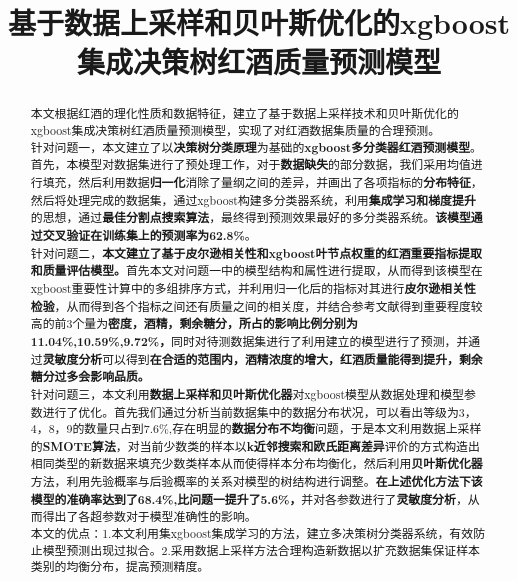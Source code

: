\documentclass{whutmod}
\title{基于数据上采样和贝叶斯优化的xgboost集成决策树红酒质量预测模型}
\begin{document}
\maketitle
\begin{abstract}
	本文根据红酒的理化性质和数据特征，建立了基于数据上采样技术和贝叶斯优化的xgboost集成决策树红酒质量预测模型，实现了对红酒数据集质量的合理预测。
	~\\
	
	针对问题一，本文建立了以\textbf{决策树分类原理}为基础的\textbf{xgboost多分类器红酒预测模型}。首先，本模型对数据集进行了预处理工作，对于\textbf{数据缺失}的部分数据，我们采用均值进行填充，然后利用数据\textbf{归一化}消除了量纲之间的差异，并画出了各项指标的\textbf{分布特征}，然后将处理完成的数据集，通过xgboost构建多分类器系统，利用\textbf{集成学习和梯度提升}的思想，通过\textbf{最佳分割点搜索算法}，最终得到预测效果最好的多分类器系统。\textbf{该模型通过交叉验证在训练集上的预测率为62.8\%}。
	~\\
	
	针对问题二，\textbf{本文建立了基于皮尔逊相关性和xgboost叶节点权重的红酒重要指标提取和质量评估模型。}首先本文对问题一中的模型结构和属性进行提取，从而得到该模型在xgboost重要性计算中的多组排序方式，并利用归一化后的指标对其进行\textbf{皮尔逊相关性检验}，从而得到各个指标之间还有质量之间的相关度，并结合参考文献得到重要程度较高的前3个量为\textbf{密度，酒精，剩余糖分，所占的影响比例分别为11.04\%,10.59\%,9.72\%，}同时对待测数据集进行了利用建立的模型进行了预测，并通过\textbf{灵敏度分析}可以得到\textbf{在合适的范围内，酒精浓度的增大，红酒质量能得到提升，剩余糖分过多会影响品质。}
	~\\
	
	针对问题三，本文利用\textbf{数据上采样和贝叶斯优化器}对xgboost模型从数据处理和模型参数进行了优化。首先我们通过分析当前数据集中的数据分布状况，可以看出等级为3，4，8，9的数量只占到7.6\%,存在明显的\textbf{数据分布不均衡}问题，于是本文利用数据上采样的\textbf{SMOTE算法}，对当前少数类的样本以\textbf{k近邻搜索和欧氏距离差异}评价的方式构造出相同类型的新数据来填充少数类样本从而使得样本分布均衡化，然后利用\textbf{贝叶斯优化器}方法，利用先验概率与后验概率的关系对模型的树结构进行调整。\textbf{在上述优化方法下该模型的准确率达到了68.4\%,比问题一提升了5.6\%，}并对各参数进行了\textbf{灵敏度分析}，从而得出了各超参数对于模型准确性的影响。
	~\\
	
	本文的优点：1.本文利用集xgboost集成学习的方法，建立多决策树分类器系统，有效防止模型预测出现过拟合。2.采用数据上采样方法合理构造新数据以扩充数据集保证样本类别的均衡分布，提高预测精度。
	
	
\end{abstract}
\end{document}
